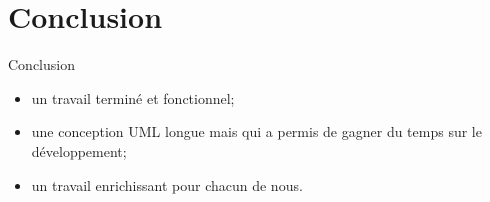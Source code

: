 \documentclass{beamer}
\begin{document}
\section*{Conclusion}

\begin{frame}{Conclusion}

	\begin{itemize}
		\item un travail terminé et fonctionnel;
		\vspace*{0.5cm}
		\item une conception UML longue mais qui a permis de gagner du temps sur le développement;
		\vspace*{0.5cm}	
		\item un travail enrichissant pour chacun de nous.
	\end{itemize}

\end{frame}
\end{document}

